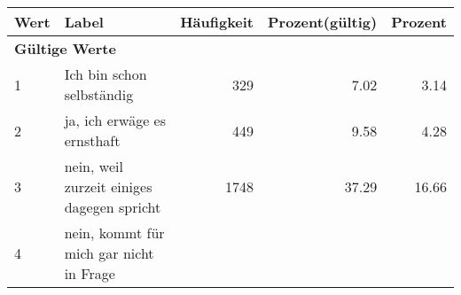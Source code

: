      \begin{longtable}{lXrrr}
     \toprule
     \textbf{Wert} & \textbf{Label} & \textbf{Häufigkeit} & \textbf{Prozent(gültig)} & \textbf{Prozent} \\
     \endhead
     \midrule
     \multicolumn{5}{l}{\textbf{Gültige Werte}}\\

     1 &
     \multicolumn{1}{X}{ Ich bin schon selbständig   } &


       \num{329} &
       \num[round-mode=places,round-precision=2]{7.02} &
         \num[round-mode=places,round-precision=2]{3.14} \\

     2 &
     \multicolumn{1}{X}{ ja, ich erwäge es ernsthaft   } &


       \num{449} &
       \num[round-mode=places,round-precision=2]{9.58} &
         \num[round-mode=places,round-precision=2]{4.28} \\

     3 &
     \multicolumn{1}{X}{ nein, weil zurzeit einiges dagegen spricht   } &


       \num{1748} &
       \num[round-mode=places,round-precision=2]{37.29} &
         \num[round-mode=places,round-precision=2]{16.66} \\

     4 &
     \multicolumn{1}{X}{ nein, kommt für mich gar nicht in Frage   } &



\end{longtable}
